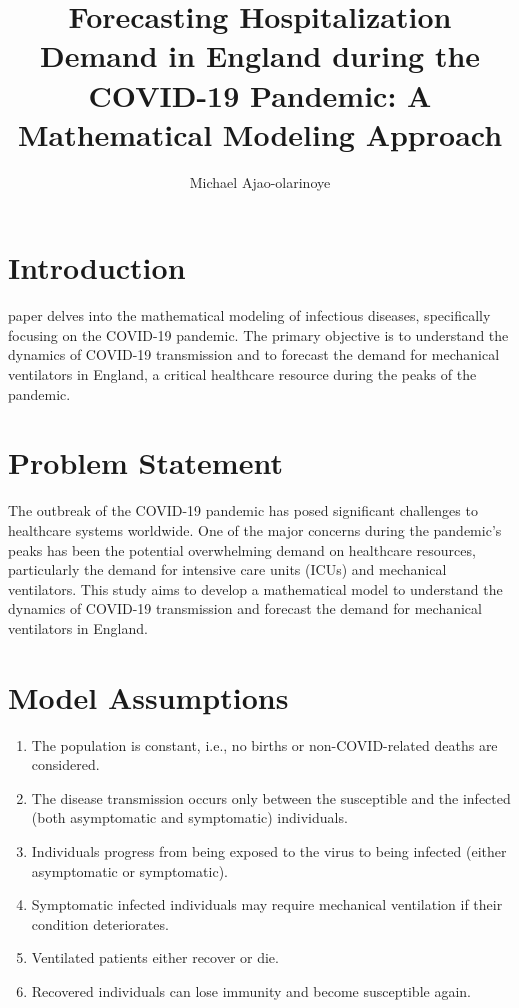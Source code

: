 \documentclass[lettersize, journal]{IEEEtran}
\begin{document}
\title{Forecasting Hospitalization Demand in England during the COVID-19 Pandemic: A Mathematical Modeling Approach}
\author{Michael Ajao-olarinoye}

\maketitle


\begin{abstract}

\end{abstract}

\begin{IEEEkeywords}

\end{IEEEkeywords}

\section{Introduction}
 paper delves into the mathematical modeling of infectious diseases, specifically focusing on the COVID-19 pandemic. The primary objective is to understand the dynamics of COVID-19 transmission and to forecast the demand for mechanical ventilators in England, a critical healthcare resource during the peaks of the pandemic.

\section{Problem Statement}
The outbreak of the COVID-19 pandemic has posed significant challenges to healthcare systems worldwide. One of the major concerns during the pandemic's peaks has been the potential overwhelming demand on healthcare resources, particularly the demand for intensive care units (ICUs) and mechanical ventilators. This study aims to develop a mathematical model to understand the dynamics of COVID-19 transmission and forecast the demand for mechanical ventilators in England.

\section{Model Assumptions}
\begin{enumerate}
    \item The population is constant, i.e., no births or non-COVID-related deaths are considered.
    \item The disease transmission occurs only between the susceptible and the infected (both asymptomatic and symptomatic) individuals.
    \item Individuals progress from being exposed to the virus to being infected (either asymptomatic or symptomatic).
    \item Symptomatic infected individuals may require mechanical ventilation if their condition deteriorates.
    \item Ventilated patients either recover or die.
    \item Recovered individuals can lose immunity and become susceptible again.
\end{enumerate}
\end{document}

